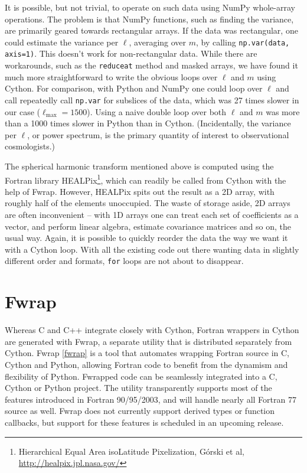 \documentclass[letterpaper,11pt,english]{article}
\newcommand{\code}[1]{\texttt{#1}}
\begin{document}
It is possible, but not trivial, to operate on such data using NumPy
whole-array operations. The problem is that NumPy functions, such as
finding the variance, are primarily geared towards rectangular arrays.
If the data was rectangular, one could estimate the variance per
$\ell$, averaging over $m$, by calling \code{np.var(data,
axis=1)}. This doesn't work for non-rectangular data. While there are
workarounds, such as the \code{reduceat} method and masked arrays, we
have found it much more straightforward to write the obvious loops
over $\ell$ and $m$ using Cython. For comparison, with
Python and NumPy one could loop over $\ell$ and call repeatedly
call \code{np.var} for subslices of the data, which was 27 times slower
in our case ($\ell_{\mathrm{max}} = 1500$). Using a naive double
loop over both $\ell$ and $m$ was more than a 1000 times
slower in Python than in Cython.  (Incidentally, the variance per
$\ell$, or power spectrum, is the primary quantity of interest
to observational cosmologists.)

The spherical harmonic transform mentioned above is computed using the
Fortran library HEALPix\footnote{
Hierarchical Equal Area isoLatitude Pixelization, Górski et
al, \href{http://healpix.jpl.nasa.gov/}{http://healpix.jpl.nasa.gov/}
}, which can readily be called from Cython
with the help of Fwrap.  However, HEALPix spits out the result as a
2D array, with roughly half of the elements unoccupied. The waste of
storage aside, 2D arrays are often inconvenient -- with 1D arrays one
can treat each set of coefficients as a vector, and perform linear
algebra, estimate covariance matrices and so on, the usual way. Again,
it is possible to quickly reorder the data the way we want it with a
Cython loop. With all the existing code out there wanting data in
slightly different order and formats, \code{for} loops are not about to
disappear.


\section{Fwrap}

Whereas C and C++ integrate closely with Cython, Fortran wrappers in
Cython are generated with Fwrap, a separate utility that is
distributed separately from Cython.  Fwrap \hyperlink{id10}{{[}fwrap{]}} is a tool that
automates wrapping Fortran source in C, Cython and Python, allowing
Fortran code to benefit from the dynamism and flexibility of Python.
Fwrapped code can be seamlessly integrated into a C, Cython or Python
project.  The utility transparently supports most of the features
introduced in Fortran 90/95/2003, and will handle nearly all Fortran
77 source as well.  Fwrap does not currently support derived types or
function callbacks, but support for these features is scheduled in an
upcoming release.
\end{document}
